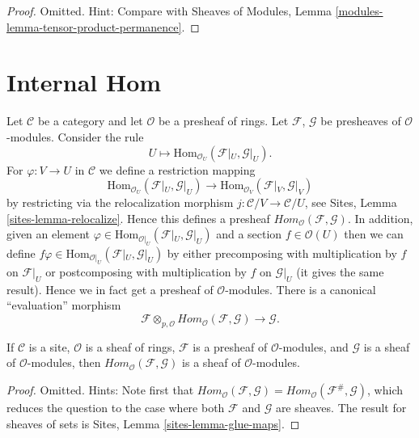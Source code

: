 \begin{proof}
Omitted. Hint: Compare with
Sheaves of Modules, Lemma \ref{modules-lemma-tensor-product-permanence}.
\end{proof}



\section{Internal Hom}
\label{section-internal-hom}

\noindent
Let $\mathcal{C}$ be a category and let $\mathcal{O}$ be a presheaf
of rings. Let $\mathcal{F}$, $\mathcal{G}$ be presheaves of
$\mathcal{O}$-modules. Consider the rule
$$
U \longmapsto \text{Hom}_{\mathcal{O}_U}(\mathcal{F}|_U, \mathcal{G}|_U).
$$
For $\varphi : V \to U$ in $\mathcal{C}$ we define a restriction mapping
$$
\text{Hom}_{\mathcal{O}_U}(\mathcal{F}|_U, \mathcal{G}|_U)
\longrightarrow
\text{Hom}_{\mathcal{O}_V}(\mathcal{F}|_V, \mathcal{G}|_V)
$$
by restricting via the relocalization morphism
$j : \mathcal{C}/V \to \mathcal{C}/U$, see
Sites, Lemma \ref{sites-lemma-relocalize}. Hence this defines a
presheaf $\textit{Hom}_{\mathcal{O}}(\mathcal{F}, \mathcal{G})$.
In addition, given an element
$\varphi \in \text{Hom}_{\mathcal{O}|_U}(\mathcal{F}|_U, \mathcal{G}|_U)$
and a section $f \in \mathcal{O}(U)$ then we can define
$f\varphi \in \text{Hom}_{\mathcal{O}|_U}(\mathcal{F}|_U, \mathcal{G}|_U)$
by either precomposing with multiplication by $f$ on $\mathcal{F}|_U$
or postcomposing with multiplication by $f$ on $\mathcal{G}|_U$ (it gives
the same result). Hence we in fact get a presheaf of $\mathcal{O}$-modules.
There is a canonical ``evaluation'' morphism
$$
\mathcal{F}
\otimes_{p, \mathcal{O}}
\textit{Hom}_{\mathcal{O}}(\mathcal{F}, \mathcal{G})
\longrightarrow
\mathcal{G}.
$$

\begin{lemma}
\label{lemma-internal-hom}
If $\mathcal{C}$ is a site, $\mathcal{O}$ is a sheaf of rings,
$\mathcal{F}$ is a presheaf of $\mathcal{O}$-modules, and
$\mathcal{G}$ is a sheaf of $\mathcal{O}$-modules, then
$\textit{Hom}_{\mathcal{O}}(\mathcal{F}, \mathcal{G})$
is a sheaf of $\mathcal{O}$-modules.
\end{lemma}

\begin{proof}
Omitted. Hints: Note first that
$\textit{Hom}_{\mathcal{O}}(\mathcal{F}, \mathcal{G})
= \textit{Hom}_{\mathcal{O}}(\mathcal{F}^\#, \mathcal{G})$, which reduces
the question to the case where both $\mathcal{F}$ and $\mathcal{G}$
are sheaves. The result for sheaves of sets is
Sites, Lemma \ref{sites-lemma-glue-maps}.
\end{proof}


